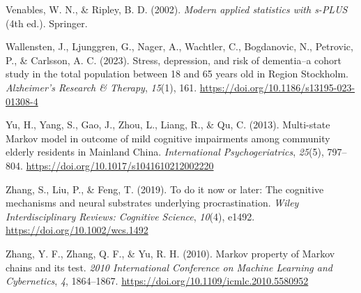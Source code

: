 \documentclass[
]{article}
\newlength{\cslhangindent}
\newenvironment{CSLReferences}[2] %
 {\begin{list}{}{%
  \setlength{\itemindent}{0pt}
  \setlength{\leftmargin}{0pt}
  \setlength{\parsep}{0pt}
  \ifodd #1
   \setlength{\leftmargin}{\cslhangindent}
   \setlength{\itemindent}{-1\cslhangindent}
  \fi
  \setlength{\itemsep}{#2\baselineskip}}}
 {\end{list}}
\begin{document}
\begin{CSLReferences}{1}{0}
Venables, W. N., \& Ripley, B. D. (2002). \emph{Modern applied
statistics with s-{PLUS}} (4th ed.). Springer.

Wallensten, J., Ljunggren, G., Nager, A., Wachtler, C., Bogdanovic, N.,
Petrovic, P., \& Carlsson, A. C. (2023). Stress, depression, and risk of
dementia--a cohort study in the total population between 18 and 65 years
old in {Region Stockholm}. \emph{Alzheimer's Research \& Therapy},
\emph{15}(1), 161. \url{https://doi.org/10.1186/s13195-023-01308-4}

Yu, H., Yang, S., Gao, J., Zhou, L., Liang, R., \& Qu, C. (2013).
Multi-state {Markov} model in outcome of mild cognitive impairments
among community elderly residents in {Mainland China}.
\emph{International Psychogeriatrics}, \emph{25}(5), 797--804.
\url{https://doi.org/10.1017/s1041610212002220}

Zhang, S., Liu, P., \& Feng, T. (2019). To do it now or later: {The}
cognitive mechanisms and neural substrates underlying procrastination.
\emph{Wiley Interdisciplinary Reviews: Cognitive Science}, \emph{10}(4),
e1492. \url{https://doi.org/10.1002/wcs.1492}

Zhang, Y. F., Zhang, Q. F., \& Yu, R. H. (2010). Markov property of
{Markov} chains and its test. \emph{2010 International Conference on
Machine Learning and Cybernetics}, \emph{4}, 1864--1867.
\url{https://doi.org/10.1109/icmlc.2010.5580952}

\end{CSLReferences}
\end{document}
